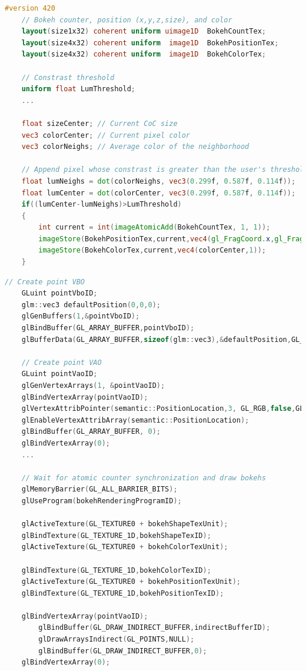 \begin{lstlisting}[language=GLSL,float={htb},caption={Fragment shader for extracting \bokehs \emph{(Pass 2)}.},label={DeRousiers:bokehextractionfs}]	
	#version 420
	// Bokeh counter, position (x,y,z,size), and color
	layout(size1x32) coherent uniform uimage1D 	BokehCountTex;
	layout(size4x32) coherent uniform  image1D 	BokehPositionTex;
	layout(size4x32) coherent uniform  image1D 	BokehColorTex;

	// Constrast threshold
	uniform float LumThreshold;
	...

	float sizeCenter; // Current CoC size
	vec3 colorCenter; // Current pixel color
	vec3 colorNeighs; // Average color of the neighborhood

	// Append pixel whose constrast is greater than the user's threshold
	float lumNeighs = dot(colorNeighs, vec3(0.299f, 0.587f, 0.114f));
	float lumCenter = dot(colorCenter, vec3(0.299f, 0.587f, 0.114f));
	if((lumCenter-lumNeighs)>LumThreshold)
	{
		int current = int(imageAtomicAdd(BokehCountTex, 1, 1));
		imageStore(BokehPositionTex,current,vec4(gl_FragCoord.x,gl_FragCoord.y,gl_FragCoord.z,sizeCenter));
		imageStore(BokehColorTex,current,vec4(colorCenter,1));
	}
\end{lstlisting}




\begin{lstlisting}[language=C++,float={htb},caption={Host application for rendering bokeh \emph{(Pass 4)}.},label={DeRousiers:renderingbokehcpp}]
	// Create point VBO
	GLuint pointVboID;
	glm::vec3 defaultPosition(0,0,0);
	glGenBuffers(1,&pointVboID);
	glBindBuffer(GL_ARRAY_BUFFER,pointVboID);
	glBufferData(GL_ARRAY_BUFFER,sizeof(glm::vec3),&defaultPosition,GL_STATIC_DRAW);

	// Create point VAO
	GLuint pointVaoID;
	glGenVertexArrays(1, &pointVaoID);
	glBindVertexArray(pointVaoID);
	glVertexAttribPointer(semantic::PositionLocation,3, GL_RGB,false,GL_FLOAT,GLF_BUFFER_OFFSET(_offset));
	glEnableVertexAttribArray(semantic::PositionLocation);
	glBindBuffer(GL_ARRAY_BUFFER, 0);
	glBindVertexArray(0);
	...

	// Wait for atomic counter synchronization and draw bokehs
	glMemoryBarrier(GL_ALL_BARRIER_BITS);
	glUseProgram(bokehRenderingProgramID);

	glActiveTexture(GL_TEXTURE0 + bokehShapeTexUnit);
	glBindTexture(GL_TEXTURE_1D,bokehShapeTexID);
	glActiveTexture(GL_TEXTURE0 + bokehColorTexUnit);

	glBindTexture(GL_TEXTURE_1D,bokehColorTexID);
	glActiveTexture(GL_TEXTURE0 + bokehPositionTexUnit);
	glBindTexture(GL_TEXTURE_1D,bokehPositionTexID);

	glBindVertexArray(pointVaoID);
		glBindBuffer(GL_DRAW_INDIRECT_BUFFER,indirectBufferID);
		glDrawArraysIndirect(GL_POINTS,NULL);
		glBindBuffer(GL_DRAW_INDIRECT_BUFFER,0);
	glBindVertexArray(0);
\end{lstlisting}


